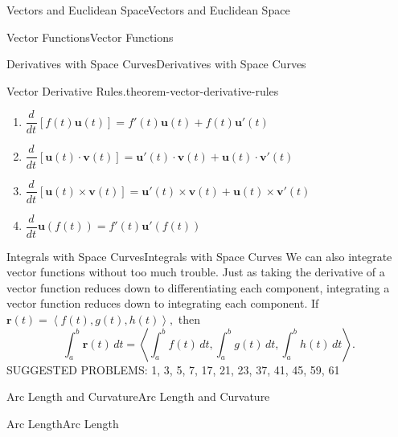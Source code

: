 \documentclass[10pt,]{book}
\numberwithin{equation}{section}
\newcommand{\vv}[1]{\mathbf{#1}}
\newcommand{\dv}[3][]{\dfrac{d^{#1} #2}{d #3^{#1}}}
\newcommand{\dotprod}[1]{\left\langle #1 \right\rangle}
\begin{document}
\begin{chapterptx}{Vectors and Euclidean Space}{}{Vectors and Euclidean Space}{}{}
\begin{sectionptx}{Vector Functions}{}{Vector Functions}{}{}
\begin{subsectionptx}{Derivatives with Space Curves}{}{Derivatives with Space Curves}{}{}
\begin{theorem}{Vector Derivative Rules.}{}{theorem-vector-derivative-rules}
\begin{enumerate}
\item\hypertarget{li-88}{}\(\dv{}{t}[f(t)\vv{u}(t)] = f'(t)\vv{u}(t)+f(t)\vv{u}'(t)\)%
\item\hypertarget{li-89}{}\(\dv{}{t}[\vv{u}(t)\cdot\vv{v}(t)] = \vv{u}'(t)\cdot\vv{v}(t)+\vv{u}(t)\cdot\vv{v}'(t)\)%
\item\hypertarget{li-90}{}\(\dv{}{t}[\vv{u}(t)\times\vv{v}(t)] = \vv{u}'(t)\times\vv{v}(t)+\vv{u}(t)\times\vv{v}'(t)\)%
\item\hypertarget{li-91}{}\(\dv{}{t}\vv{u}(f(t)) = f'(t)\vv{u}'(f(t))\)%
\end{enumerate}
\end{theorem}
\end{subsectionptx}
%
%
\typeout{************************************************}
\typeout{************************************************}
%
\begin{subsectionptx}{Integrals with Space Curves}{}{Integrals with Space Curves}{}{}\label{subsection-integrals-with-space-curves}
\hypertarget{p-1057}{}%
We can also integrate vector functions without too much trouble. Just as taking the derivative of a vector function reduces down to differentiating each component, integrating a vector function reduces down to integrating each component. If \(\vv{r}(t) = \dotprod{f(t),g(t),h(t)},\) then%
%
\begin{equation}
\int_{a}^{b}\vv{r}(t)\,dt = \dotprod{\int_{a}^{b}f(t)\,dt,\int_{a}^{b}g(t)\,dt,\int_{a}^{b}h(t)\,dt}.\label{equation-vector-function-integration}
\end{equation}
\hypertarget{p-1058}{}%
SUGGESTED PROBLEMS: 1, 3, 5, 7, 17, 21, 23, 37, 41, 45, 59, 61%
\end{subsectionptx}
\end{sectionptx}
%
%
\typeout{************************************************}
\typeout{************************************************}
%
\begin{sectionptx}{Arc Length and Curvature}{}{Arc Length and Curvature}{}{}\label{section-arc-length-and-curvature}
%
%
\typeout{************************************************}
\typeout{************************************************}
%
\begin{subsectionptx}{Arc Length}{}{Arc Length}{}{}\label{subsection-arc-length}
\hypertarget{p-1059}{}%

\end{subsectionptx}
\end{sectionptx}
\end{chapterptx}
\end{document}
